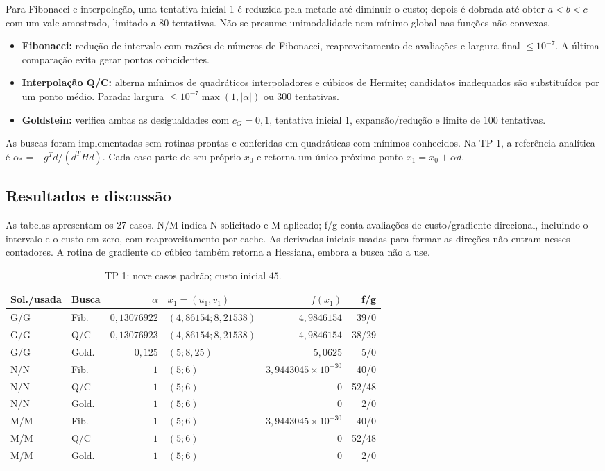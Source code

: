 \documentclass[12pt,a4paper]{article}
\begin{document}
Para Fibonacci e interpolação, uma tentativa inicial 1 é reduzida pela
metade até diminuir o custo; depois é dobrada até obter $a<b<c$ com um
vale amostrado, limitado a 80 tentativas. Não se presume unimodalidade nem
mínimo global nas funções não convexas.

\begin{itemize}
\item \textbf{Fibonacci:} redução de intervalo com razões de números de
Fibonacci, reaproveitamento de avaliações e largura final $\leq10^{-7}$.
A última comparação evita gerar pontos coincidentes.
\item \textbf{Interpolação Q/C:} alterna mínimos de quadráticos interpoladores
e cúbicos de Hermite; candidatos inadequados são substituídos por um ponto
médio. Parada: largura $\leq10^{-7}\max(1,|\alpha|)$ ou 300 tentativas.
\item \textbf{Goldstein:} verifica ambas as desigualdades com $c_G=0{,}1$,
tentativa inicial 1, expansão/redução e limite de 100 tentativas.
\end{itemize}
As buscas foram implementadas sem rotinas prontas e conferidas em
quadráticas com mínimos conhecidos. Na TP 1, a referência analítica é
$\alpha_*=-g^Td/(d^THd)$. Cada caso parte de seu próprio $x_0$ e retorna
um único próximo ponto $x_1=x_0+\alpha d$.

\subsection{Resultados e discussão}
As tabelas apresentam os 27 casos. N/M indica N solicitado e M aplicado;
f/g conta avaliações de custo/gradiente direcional, incluindo o intervalo
e o custo em zero, com reaproveitamento por cache. As derivadas iniciais
usadas para formar as direções não entram nesses contadores. A rotina de
gradiente do cúbico também retorna a Hessiana, embora a busca não a use.
\begin{table}[htbp]
\centering
\small
\caption{TP 1: nove casos padrão; custo inicial $45$.}
\begin{tabular}{llrlrr}
\toprule
Sol./usada & Busca & $\alpha$ & $x_1=(u_1,v_1)$ & $f(x_1)$ & f/g \\
\midrule
G/G & Fib. & $0{,}13076922$ & $(4{,}86154; 8{,}21538)$ & $4{,}9846154$ & 39/0 \\
G/G & Q/C & $0{,}13076923$ & $(4{,}86154; 8{,}21538)$ & $4{,}9846154$ & 38/29 \\
G/G & Gold. & $0{,}125$ & $(5; 8{,}25)$ & $5{,}0625$ & 5/0 \\
N/N & Fib. & $1$ & $(5; 6)$ & $3{,}9443045\times10^{-30}$ & 40/0 \\
N/N & Q/C & $1$ & $(5; 6)$ & $0$ & 52/48 \\
N/N & Gold. & $1$ & $(5; 6)$ & $0$ & 2/0 \\
M/M & Fib. & $1$ & $(5; 6)$ & $3{,}9443045\times10^{-30}$ & 40/0 \\
M/M & Q/C & $1$ & $(5; 6)$ & $0$ & 52/48 \\
M/M & Gold. & $1$ & $(5; 6)$ & $0$ & 2/0 \\
\bottomrule
\end{tabular}
\end{table}
\end{document}
